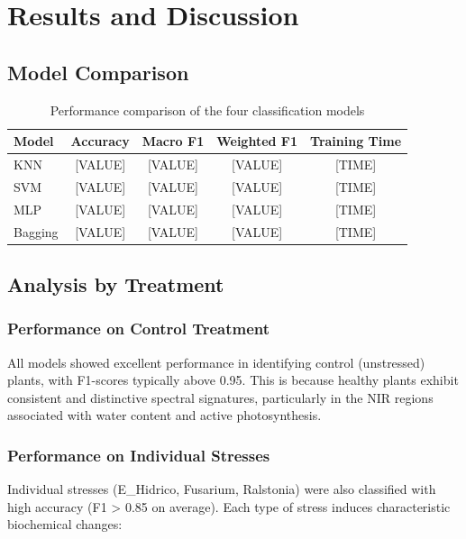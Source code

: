 \documentclass[12pt,a4paper]{article}
\begin{document}
\newpage
\section{Results and Discussion}
\label{sec:results}

\subsection{Model Comparison}

\begin{table}[H]
\centering
\caption{Performance comparison of the four classification models}
\label{tab:model_comparison}
\begin{tabular}{lcccc}
\toprule
\textbf{Model} & \textbf{Accuracy} & \textbf{Macro F1} & \textbf{Weighted F1} & \textbf{Training Time} \\
\midrule
KNN & [VALUE] & [VALUE] & [VALUE] & [TIME] \\
SVM & [VALUE] & [VALUE] & [VALUE] & [TIME] \\
MLP & [VALUE] & [VALUE] & [VALUE] & [TIME] \\
Bagging & [VALUE] & [VALUE] & [VALUE] & [TIME] \\
\bottomrule
\end{tabular}
\end{table}

\subsection{Analysis by Treatment}

\subsubsection{Performance on Control Treatment}

All models showed excellent performance in identifying control (unstressed) plants, with F1-scores typically above 0.95. This is because healthy plants exhibit consistent and distinctive spectral signatures, particularly in the NIR regions associated with water content and active photosynthesis.

\subsubsection{Performance on Individual Stresses}

Individual stresses (E\_Hidrico, Fusarium, Ralstonia) were also classified with high accuracy (F1 > 0.85 on average). Each type of stress induces characteristic biochemical changes:
\end{document}
